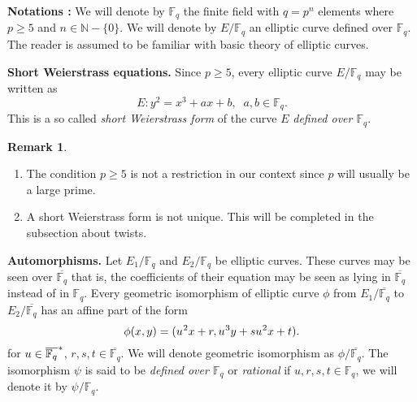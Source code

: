 \documentclass[10pt]{article}
\theoremstyle{definition}
\newtheorem{remark}{Remark}
\newcommand{\N}{\mathbb{N}}
\newcommand{\F}{\mathbb{F}}
\begin{document}
\textbf{Notations :}
We will denote by $\F_q$ the finite field with $q = p^n$ elements where $p \geq 5$ and $n \in \N - \lbrace 0 \rbrace$.
We will denote by $E/\F_q$ an elliptic curve defined over $\F_q$. 
The reader is assumed to be familiar with basic theory of elliptic curves.


\noindent \textbf{Short Weierstrass equations.}  Since $p\geq 5$, every elliptic curve $E/\F_q$ may be written as
\[ E : y^2 = x^3 + ax + b, \; \; a,b \in \F_q. \]
This is a so called \textsl{short Weierstrass form} of the curve $E$ \textsl{defined over $\F_q$}.


\noindent \begin{remark} 
\begin{enumerate}
\item The condition $p \geq 5$ is not a restriction in our context since $p$ will usually be a large prime.
\item A short Weierstrass form is not unique.
This will be completed in the subsection about twists.
\end{enumerate}
\end{remark}

\noindent \textbf{Automorphisms.} Let $E_1/\F_q$ and $E_2/\F_q$ be elliptic curves. 
These curves may be seen over $\overline{\F_q}$ that is, the coefficients of their equation may be seen as lying in $\overline{\F_q}$ instead of in $\F_q$.
Every geometric isomorphism of elliptic curve $\phi$ from $E_1/\overline{\F_q}$ to $E_2/\overline{\F_q}$ has an  affine part of the form 
\begin{equation}\label{morphism}
 \phi(x,y) = (u^{\mkern1mu 2}x + r, u^{\mkern1mu 3}y + su^{\mkern1mu 2}x + t).
\end{equation}
for $u \in \overline{\F_q}^{\mkern1mu *}$, $r,s,t \in \overline{\F_q}$.
We will denote geometric isomorphism as $\phi/\overline{\F_q}$.
The isomorphism $\psi$ is said to be \textsl{defined over $\F_q$} or \textsl{rational} if $u,r,s,t \in \F_q$, we will denote it by $\psi/\F_q$.
\end{document}
